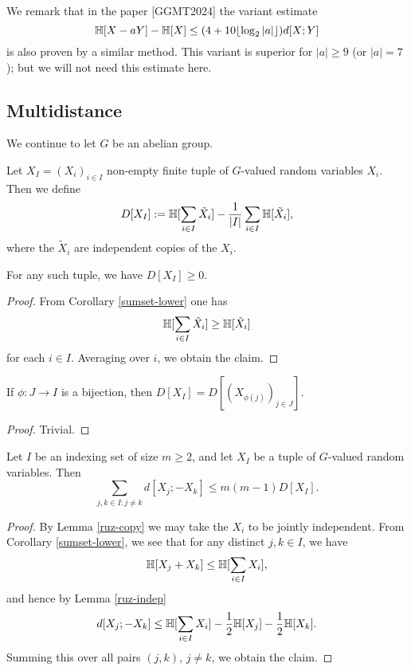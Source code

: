 We remark that in the paper [GGMT2024] the variant estimate
$$\mathbb{H}[X-aY] - \mathbb{H}[X] \leq (4 + 10 \lfloor \log_2 |a| \rfloor) d[X;Y]$$
is also proven by a similar method.  This variant is superior for $|a| \geq 9$ (or $|a|=7$); but we will not need this estimate here.



\subsection{Multidistance}

We continue to let $G$ be an abelian group.

\begin{definition}[Multidistance]\label{multidist-def}  Let $X_I = (X_i)_{i \in I}$ non-empty finite tuple of $G$-valued random variables $X_i$. Then we define
\[
  D[X_{I}] := \mathbb{H}[\sum_{i \in I} \tilde X_i] - \frac{1}{|I|} \sum_{i \in I} \mathbb{H}[\tilde X_i],
\]
where the $\tilde X_i$ are independent copies of the $X_i$.
\end{definition}

\begin{lemma}[Nonnegativity]\label{multidist-nonneg}  For any such tuple, we have $D[X_I] \geq 0$.
\end{lemma}

\begin{proof}  From Corollary \ref{sumset-lower} one has
$$ \mathbb{H}[\sum_{i \in I} \tilde X_i] \geq \mathbb{H}[\tilde X_i]$$
for each $i \in I$.  Averaging over $i$, we obtain the claim.
\end{proof}

\begin{lemma}[Relabeling]\label{multidist-perm} If $\phi: J \to I$ is a bijection, then $D[X_I] = D[(X_{\phi(j)})_{j \in J}]$.
\end{lemma}

\begin{proof} Trivial.
\end{proof}

\begin{lemma}\label{multidist-ruzsa-I}
  Let $I$ be an indexing set of size $m \ge 2$, and let $X_{I}$ be a tuple of $G$-valued random variables. Then
  $$\sum_{j,k \in I: j \neq k} d[X_j; -X_k] \leq m(m-1) D[X_I].$$
\end{lemma}

\begin{proof}
By Lemma \ref{ruz-copy} we may take the $X_i$ to be jointly independent.  From Corollary \ref{sumset-lower}, we see that for any distinct $j,k \in I$, we have
  \[
    \mathbb{H}[X_j+X_k] \leq \mathbb{H}[\sum_{i \in I} X_i],
  \]
  and hence by Lemma \ref{ruz-indep}
  \[
    d[X_j;-X_k] \leq \mathbb{H}[\sum_{i \in I} X_i] - \frac{1}{2} \mathbb{H}[X_j] - \frac{1}{2} \mathbb{H}[X_k].
  \]
  Summing this over all pairs $(j,k)$, $j \neq k$, we obtain the claim.
\end{proof}

